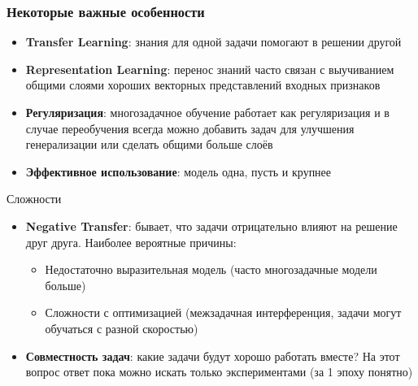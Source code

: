 \documentclass[aspectratio=169]{beamer}
\begin{document}
\begin{frame}
\frametitle{Некоторые важные особенности}
\begin{itemize}
	\item \textbf{Transfer Learning}: знания для одной задачи помогают в решении другой
	\item \textbf{Representation Learning}: перенос знаний часто связан с выучиванием общими слоями хороших векторных представлений входных признаков
	\item \textbf{Регуляризация}: многозадачное обучение работает как регуляризация и в случае переобучения всегда можно добавить задач для улучшения генерализации или сделать общими больше слоёв
	\item \textbf{Эффективное использование}: модель одна, пусть и крупнее
\end{itemize}
Сложности
\begin{itemize}
	\item \textbf{Negative Transfer}: бывает, что задачи отрицательно влияют на решение друг друга. Наиболее вероятные причины:
	\begin{itemize}
		\item Недостаточно выразительная модель (часто многозадачные модели больше)
		\item Сложности с оптимизацией (межзадачная интерференция, задачи могут обучаться с разной скоростью)
	\end{itemize}
	\item \textbf{Совместность задач}: какие задачи будут хорошо работать вместе? На этот вопрос ответ пока можно искать только экспериментами (за 1 эпоху понятно)
\end{itemize}
\end{frame}

\section[Разработка модуля]{}
\end{document}
